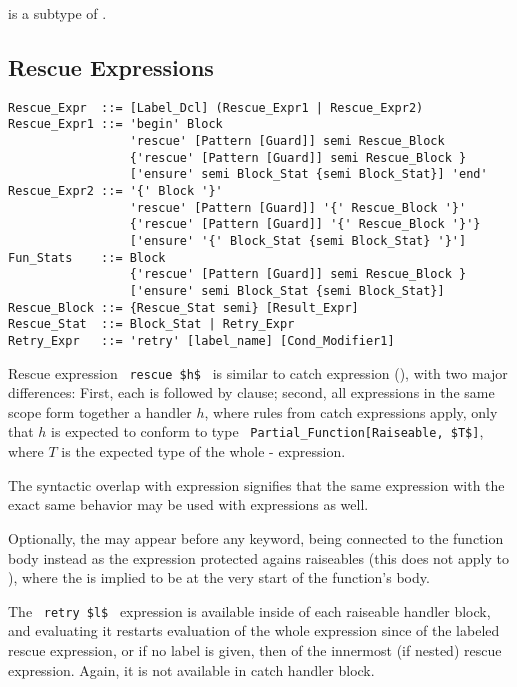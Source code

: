  is a subtype of . 







\subsection{Rescue Expressions}

\syntax\begin{lstlisting}
Rescue_Expr  ::= [Label_Dcl] (Rescue_Expr1 | Rescue_Expr2)
Rescue_Expr1 ::= 'begin' Block 
                 'rescue' [Pattern [Guard]] semi Rescue_Block
                 {'rescue' [Pattern [Guard]] semi Rescue_Block }
                 ['ensure' semi Block_Stat {semi Block_Stat}] 'end'
Rescue_Expr2 ::= '{' Block '}' 
                 'rescue' [Pattern [Guard]] '{' Rescue_Block '}'
                 {'rescue' [Pattern [Guard]] '{' Rescue_Block '}'}
                 ['ensure' '{' Block_Stat {semi Block_Stat} '}']
Fun_Stats    ::= Block
                 {'rescue' [Pattern [Guard]] semi Rescue_Block }
                 ['ensure' semi Block_Stat {semi Block_Stat}]
Rescue_Block ::= {Rescue_Stat semi} [Result_Expr]
Rescue_Stat  ::= Block_Stat | Retry_Expr
Retry_Expr   ::= 'retry' [label_name] [Cond_Modifier1]
\end{lstlisting}

Rescue expression ~\lstinline!rescue $h$!~ is similar to catch expression (), with two major differences: First, each  is followed by  clause; second, all  expressions in the same scope form together a handler $h$, where rules from catch expressions apply, only that $h$ is expected to conform to type ~\lstinline!Partial_Function[Raiseable, $T$]!, where $T$ is the expected type of the whole - expression. 

The syntactic overlap with  expression signifies that the same expression with the exact same behavior may be used with  expressions as well. 

Optionally, the  may appear before any  keyword, being connected to the function body instead as the expression protected agains raiseables (this does not apply to ), where the  is implied to be at the very start of the function's body. 

The ~\lstinline!retry $l$!~ expression is available inside of each raiseable handler block, and evaluating it restarts evaluation of the whole expression since  of the labeled rescue expression, or if no label is given, then of the innermost (if nested) rescue expression. Again, it is not available in catch handler block. 

